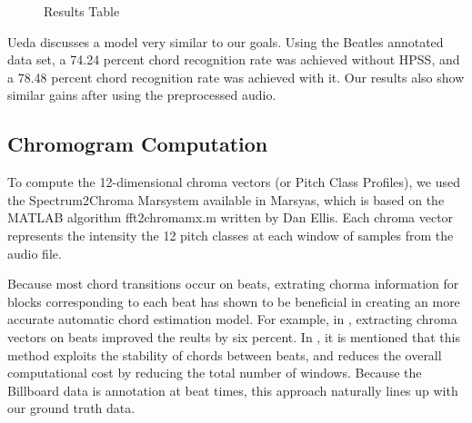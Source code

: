 \documentclass{article}
\begin{document}
\begin{figure}
\caption{Results Table}
\label{fig:resulttable}
\end{figure}

Ueda \cite{Ueda:19} discusses a model very similar to our goals. Using the
Beatles annotated data set, a 74.24 percent chord recognition rate was achieved
without HPSS, and a 78.48 percent chord recognition rate was achieved with it.
Our results also show similar gains after using the preprocessed audio.

\subsection{Chromogram Computation}

To compute the 12-dimensional chroma vectors (or Pitch Class Profiles), we used
the Spectrum2Chroma Marsystem available in Marsyas, which is based on the
MATLAB algorithm fft2chromamx.m written by Dan Ellis.  Each chroma vector
represents the intensity the 12 pitch classes at each window of samples from
the audio file.

Because most chord transitions occur on beats, extrating chorma information for
blocks corresponding to each beat has shown to be beneficial in creating an
more accurate automatic chord estimation model. For example, in \cite{Zenz:20},
extracting chroma vectors on beats improved the reults by six percent. In
\cite{McVicor:00}, it is mentioned that this method exploits the stability of
chords between beats, and reduces the overall computational cost by reducing
the total number of windows. Because the Billboard data is annotation at beat
times, this approach naturally lines up with our ground truth data.
\end{document}
